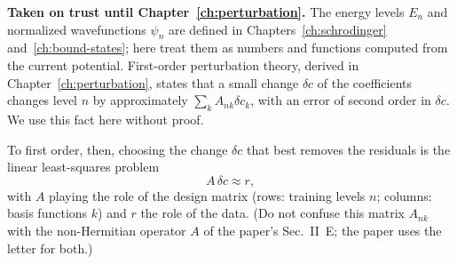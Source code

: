 \begin{beyond}
\textbf{Taken on trust until Chapter~\ref{ch:perturbation}.} The energy levels $E_n$ and normalized wavefunctions $\psi_n$ are defined in Chapters~\ref{ch:schrodinger} and~\ref{ch:bound-states}; here treat them as numbers and functions computed from the current potential. First-order perturbation theory, derived in Chapter~\ref{ch:perturbation}, states that a small change $\delta c$ of the coefficients changes level $n$ by approximately $\sum_k A_{nk}\delta c_k$, with an error of second order in $\delta c$. We use this fact here without proof.
\end{beyond}

To first order, then, choosing the change $\delta c$ that best removes the residuals is the linear least-squares problem
\begin{equation}
A\,\delta c\approx r ,
\label{eq:least-squares-paper-lin}
\end{equation}
with $A$ playing the role of the design matrix (rows: training levels $n$; columns: basis functions $k$) and $r$ the role of the data. (Do not confuse this matrix $A_{nk}$ with the non-Hermitian operator $A$ of the paper's Sec.~II~E; the paper uses the letter for both.)

